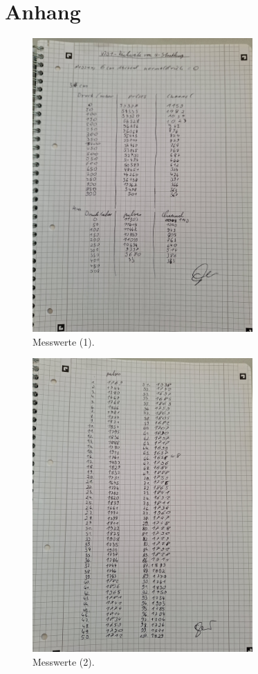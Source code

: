 \section{Anhang}
\label{sec:Anhang}

\begin{figure}
    \caption{Messwerte (1).}
    \centering
    \includegraphics[width=0.75\textwidth]{"bilder/mw1.jpg"}
\end{figure}
\begin{figure}
    \caption{Messwerte (2).}
    \centering
    \includegraphics[width=0.75\textwidth]{"bilder/mw2.jpg"}
\end{figure}